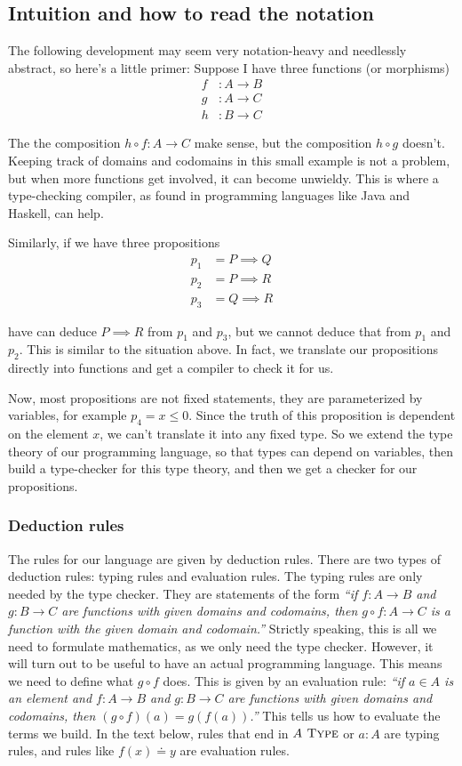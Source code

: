 \documentclass[a4paper, 12pt]{article}
\newcommand{\type}{\textsc{ Type}}
\theoremstyle{changedot}
\theoremstyle{changedotbreak}
\theoremstyle{nonumberplain}
\begin{document}
\subsection{Intuition and how to read the notation}
The following development may seem very notation-heavy and needlessly abstract, so here's a little primer: Suppose I have three functions (or morphisms)
\begin{align*}
  f &: A \to B \\
  g &: A \to C \\
  h &: B \to C
\end{align*}

The the composition $h \circ f : A \to C$ make sense, but the composition $h \circ g$ doesn't. Keeping track of domains and codomains in this small example is not a problem, but when more functions get involved, it can become unwieldy. This is where a type-checking compiler, as found in programming languages like Java and Haskell, can help.

Similarly, if we have three propositions
\begin{align*}
  p_{1} &= P \implies Q \\
  p_{2} &= P \implies R \\
  p_{3} &= Q \implies R
\end{align*}

have can deduce $P \implies R$ from $p_{1}$ and $p_{3}$, but we cannot deduce that from $p_{1}$ and $p_{2}$. This is similar to the situation above. In fact, we translate our propositions directly into functions and get a compiler to check it for us.

Now, most propositions are not fixed statements, they are parameterized by variables, for example $p_{4} = x \le 0$. Since the truth of this proposition is dependent on the element $x$, we can't translate it into any fixed type. So we extend the type theory of our programming language, so that types can depend on variables, then build a type-checker for this type theory, and then we get a checker for our propositions.

\subsubsection{Deduction rules}

The rules for our language are given by deduction rules. There are two types of deduction rules: typing rules and evaluation rules. The typing rules are only needed by the type checker. They are statements of the form \textit{``if $f : A \to B$ and $g : B \to C$ are functions with given domains and codomains, then $g \circ f : A \to C$ is a function with the given domain and codomain.''} Strictly speaking, this is all we need to formulate mathematics, as we only need the type checker. However, it will turn out to be useful to have an actual programming language. This means we need to define what $g \circ f$ does. This is given by an evaluation rule: \textit{``if $a \in A$ is an element and $f : A \to B$ and $g : B \to C$ are functions with given domains and codomains, then $(g \circ f)(a) = g(f(a))$.''} This tells us how to evaluate the terms we build. In the text below, rules that end in $A \type$ or $a : A$ are typing rules, and rules like $f(x) \doteq y$ are evaluation rules.
\end{document}
